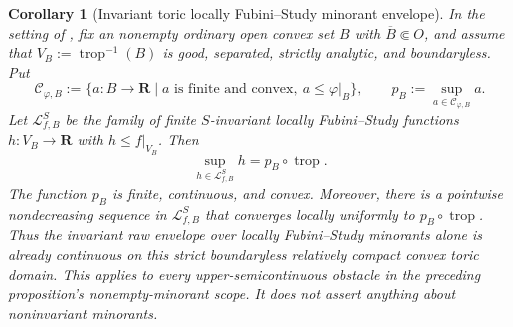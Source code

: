 \documentclass[11pt,a4paper]{article}
\newtheorem{corollary}[corollary]{Corollary}
\theoremstyle{definition}
\theoremstyle{remark}
\begin{document}
\begin{corollary}[Invariant toric locally Fubini--Study minorant envelope]
\label{cor:p033-invariant-toric-lfs-minorant-envelope}
In the setting of , fix an
nonempty ordinary open convex set \(B\) with \(\overline B\Subset O\), and assume that
\(V_B:=\operatorname{trop}^{-1}(B)\) is good, separated, strictly analytic,
and boundaryless.  Put
\[
 \mathcal C_{\varphi,B}
 :=\{a:B\longrightarrow\mathbf R\mid
       a\text{ is finite and convex},\ a\leq\varphi|_B\},
 \qquad
 p_B:=\sup_{a\in\mathcal C_{\varphi,B}}a.
\]
Let \(\mathcal L^S_{f,B}\) be the family of finite \(S\)-invariant locally
Fubini--Study functions \(h:V_B\to\mathbf R\) with \(h\leq f|_{V_B}\).
Then
\[
              \sup_{h\in\mathcal L^S_{f,B}}h
              =p_B\circ\operatorname{trop}.
\]
The function \(p_B\) is finite, continuous, and convex.  Moreover, there is
a pointwise nondecreasing sequence in \(\mathcal L^S_{f,B}\) that converges
locally uniformly to \(p_B\circ\operatorname{trop}\).  Thus the invariant
raw envelope over locally Fubini--Study minorants alone is already continuous on this
strict boundaryless relatively compact convex toric domain.  This applies to every
upper-semicontinuous obstacle in the preceding proposition's nonempty-minorant
scope.  It does not assert anything about noninvariant minorants.
\end{corollary}
\end{document}
